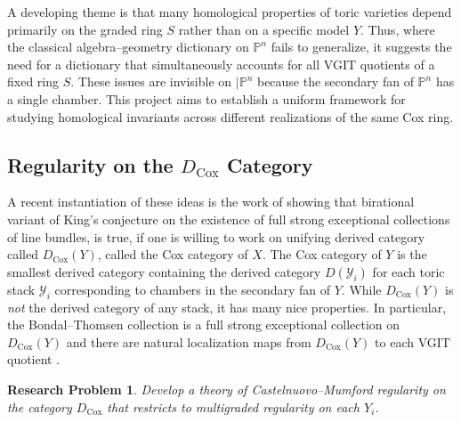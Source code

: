 \documentclass[11pt,reqno]{amsart}
\newtheorem{problem}[lemma]{Research Problem}
\theoremstyle{remark}
\newcommand{\Cox}{\operatorname{Cox}}
\newcommand{\PP}{\mathbb{P}}
\newcommand{\cY}{\mathcal{Y}}
\begin{document}
A developing theme is that many homological properties of toric varieties depend primarily on the graded ring $S$ rather than on a specific model $Y$\cite{kawamata06,kawamata13,DHL15,ballardFaveroKatzarkov19, HHL24, longLiveKing}. Thus, where the classical algebra–geometry dictionary on $\PP^n$ fails to generalize, it suggests the need for a dictionary that simultaneously accounts for all VGIT quotients of a fixed ring $S$. These issues are invisible on $|\PP^n$ because the secondary fan of $\PP^n$ has a single chamber. This project aims to establish a uniform framework for studying homological invariants across different realizations of the same Cox ring.




 \subsection{Regularity on the $D_{\Cox}$ Category}


A recent instantiation of these ideas is the work of \cite{longLiveKing} showing that birational variant of King's conjecture on the existence of full strong exceptional collections of line bundles, is true, if one is willing to work on unifying derived category called $D_{\Cox}(Y)$, called the Cox category of $X$. The Cox category of $Y$ is the smallest derived category containing the derived category $D(\cY_i)$ for each toric stack $\cY_i$ corresponding to chambers in the secondary fan of $Y$. While $D_{\Cox}(Y)$ is \emph{not} the derived category of any stack, it has many nice properties. In particular, the Bondal–Thomsen collection is a full strong exceptional collection on $D_{\Cox}(Y)$ and there are natural localization maps from $D_{\Cox}(Y)$ to each VGIT quotient \cite{longLiveKing}. 

 \begin{problem}
 	Develop a theory of Castelnuovo--Mumford regularity on the category $D_{\Cox}$ that restricts to multigraded regularity on each $Y_{i}$. 
 \end{problem}
 
\end{document}
